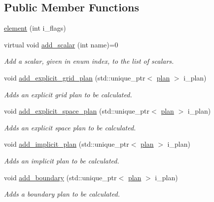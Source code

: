 \subsection*{Public Member Functions}
\begin{DoxyCompactItemize}
\item 
\hyperlink{classelement_1_1element_a5070f7c6daa24a1f207e449416089e53}{element} (int i\-\_\-flags)
\item 
virtual void \hyperlink{classelement_1_1element_a34ef8bd85c7880bb5056dd71892f2ca0}{add\-\_\-scalar} (int name)=0
\begin{DoxyCompactList}\small\item\em Add a scalar, given in enum index, to the list of scalars. \end{DoxyCompactList}\item 
void \hyperlink{classelement_1_1element_ac3039d96af5371a1455827823250492c}{add\-\_\-explicit\-\_\-grid\-\_\-plan} (std\-::unique\-\_\-ptr$<$ \hyperlink{classplan}{plan} $>$ i\-\_\-plan)
\begin{DoxyCompactList}\small\item\em Adds an explicit grid plan to be calculated. \end{DoxyCompactList}\item 
void \hyperlink{classelement_1_1element_a421ed3d85ec5c88954cceec89b776ffe}{add\-\_\-explicit\-\_\-space\-\_\-plan} (std\-::unique\-\_\-ptr$<$ \hyperlink{classplan}{plan} $>$ i\-\_\-plan)
\begin{DoxyCompactList}\small\item\em Adds an explicit space plan to be calculated. \end{DoxyCompactList}\item 
void \hyperlink{classelement_1_1element_a44598277c572a852065bf99ea50b8dda}{add\-\_\-implicit\-\_\-plan} (std\-::unique\-\_\-ptr$<$ \hyperlink{classplan}{plan} $>$ i\-\_\-plan)
\begin{DoxyCompactList}\small\item\em Adds an implicit plan to be calculated. \end{DoxyCompactList}\item 
void \hyperlink{classelement_1_1element_a0bf9ce6eff52425e8645340174840e07}{add\-\_\-boundary} (std\-::unique\-\_\-ptr$<$ \hyperlink{classplan}{plan} $>$ i\-\_\-plan)
\begin{DoxyCompactList}\small\item\em Adds a boundary plan to be calculated. \end{DoxyCompactList}\item 

\end{DoxyCompactItemize}
